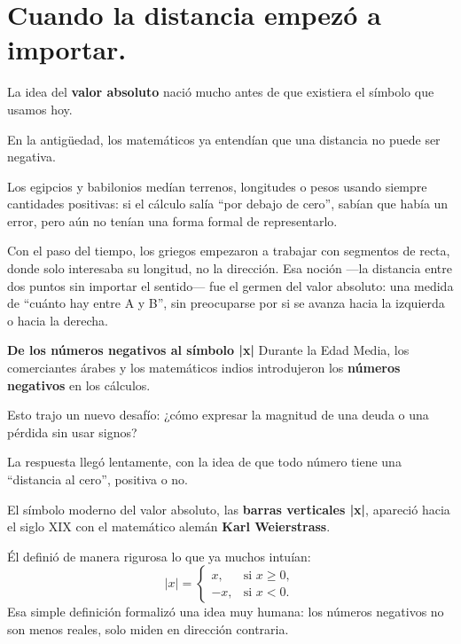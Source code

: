 
\vspace{0.5cm}

\vspace{1em}
\section*{Cuando la distancia empezó a importar.}

\begin{reseñaplana}
La idea del \textbf{valor absoluto} nació mucho antes de que existiera el símbolo que usamos hoy.

En la antigüedad, los matemáticos ya entendían que una distancia no puede ser negativa.  

Los egipcios y babilonios medían terrenos, longitudes o pesos usando siempre cantidades positivas: 
si el cálculo salía “por debajo de cero”, sabían que había un error, pero aún no tenían una forma formal de representarlo.  

Con el paso del tiempo, los griegos empezaron a trabajar con segmentos de recta, donde solo 
interesaba su longitud, no la dirección. Esa noción —la distancia entre dos puntos sin importar el sentido— fue el germen del valor 
absoluto: una medida de “cuánto hay entre A y B”, sin preocuparse por si se avanza hacia la izquierda o hacia la derecha.

\textbf{De los números negativos al símbolo |x|}  
Durante la Edad Media, los comerciantes árabes y los matemáticos indios introdujeron los \textbf{números negativos} en los cálculos.  

Esto trajo un nuevo desafío: ¿cómo expresar la magnitud de una deuda o una pérdida sin usar signos?  

La respuesta llegó lentamente, con la idea de que todo número tiene una “distancia al cero”, positiva o no.  

El símbolo moderno del valor absoluto, las \textbf{barras verticales |x|}, apareció hacia el siglo XIX 
con el matemático alemán \textbf{Karl Weierstrass}.  

Él definió de manera rigurosa lo que ya muchos intuían:  
\[
|x| = 
\begin{cases} 
x, & \text{si } x \ge 0,\\
-x, & \text{si } x < 0.
\end{cases}
\]
Esa simple definición formalizó una idea muy humana: los números negativos no son menos reales, solo miden en dirección contraria.  
\end{reseñaplana}

